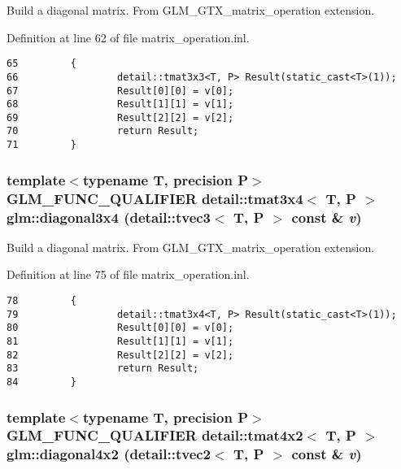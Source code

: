Build a diagonal matrix. From GLM\_\-GTX\_\-matrix\_\-operation extension. 

Definition at line 62 of file matrix\_\-operation.inl.

\begin{Code}\begin{verbatim}65         {
66                 detail::tmat3x3<T, P> Result(static_cast<T>(1));
67                 Result[0][0] = v[0];
68                 Result[1][1] = v[1];
69                 Result[2][2] = v[2];
70                 return Result;
71         }
\end{verbatim}
\end{Code}


\hypertarget{group__gtx__matrix__operation_g57adf8191f7e67838ee97d9f366fef16}{
\subsubsection[diagonal3x4]{\setlength{\rightskip}{0pt plus 5cm}template$<$typename T, precision P$>$ GLM\_\-FUNC\_\-QUALIFIER detail::tmat3x4$<$ T, P $>$ glm::diagonal3x4 (detail::tvec3$<$ T, P $>$ const \& {\em v})}}
\label{group__gtx__matrix__operation_g57adf8191f7e67838ee97d9f366fef16}


Build a diagonal matrix. From GLM\_\-GTX\_\-matrix\_\-operation extension. 

Definition at line 75 of file matrix\_\-operation.inl.

\begin{Code}\begin{verbatim}78         {
79                 detail::tmat3x4<T, P> Result(static_cast<T>(1));
80                 Result[0][0] = v[0];
81                 Result[1][1] = v[1];
82                 Result[2][2] = v[2];
83                 return Result;
84         }
\end{verbatim}
\end{Code}


\hypertarget{group__gtx__matrix__operation_ge32f9a70411084d4b33464c23b04c997}{
\subsubsection[diagonal4x2]{\setlength{\rightskip}{0pt plus 5cm}template$<$typename T, precision P$>$ GLM\_\-FUNC\_\-QUALIFIER detail::tmat4x2$<$ T, P $>$ glm::diagonal4x2 (detail::tvec2$<$ T, P $>$ const \& {\em v})}}
\label{group__gtx__matrix__operation_ge32f9a70411084d4b33464c23b04c997}


